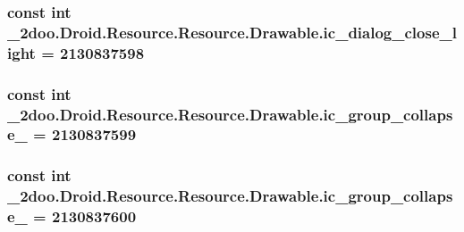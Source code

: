 \hypertarget{class__2doo_1_1_droid_1_1_resource_1_1_drawable_d271b889d9dcd0f9001d6d468b1f58f3}{
\subsubsection[{ic\_\-dialog\_\-close\_\-light}]{\setlength{\rightskip}{0pt plus 5cm}const int \_\-2doo.Droid.Resource.Resource.Drawable.ic\_\-dialog\_\-close\_\-light = 2130837598}}
\label{class__2doo_1_1_droid_1_1_resource_1_1_drawable_d271b889d9dcd0f9001d6d468b1f58f3}


\hypertarget{class__2doo_1_1_droid_1_1_resource_1_1_drawable_c1fd5d18f2ae0b5a1ac98d289ceaa425}{
\subsubsection[{ic\_\-group\_\-collapse\_\-00}]{\setlength{\rightskip}{0pt plus 5cm}const int \_\-2doo.Droid.Resource.Resource.Drawable.ic\_\-group\_\-collapse\_ = 2130837599}}
\label{class__2doo_1_1_droid_1_1_resource_1_1_drawable_c1fd5d18f2ae0b5a1ac98d289ceaa425}


\hypertarget{class__2doo_1_1_droid_1_1_resource_1_1_drawable_f0f7bd3a714a2d53656beb454ad37bdf}{
\subsubsection[{ic\_\-group\_\-collapse\_\-01}]{\setlength{\rightskip}{0pt plus 5cm}const int \_\-2doo.Droid.Resource.Resource.Drawable.ic\_\-group\_\-collapse\_ = 2130837600}}
\label{class__2doo_1_1_droid_1_1_resource_1_1_drawable_f0f7bd3a714a2d53656beb454ad37bdf}


